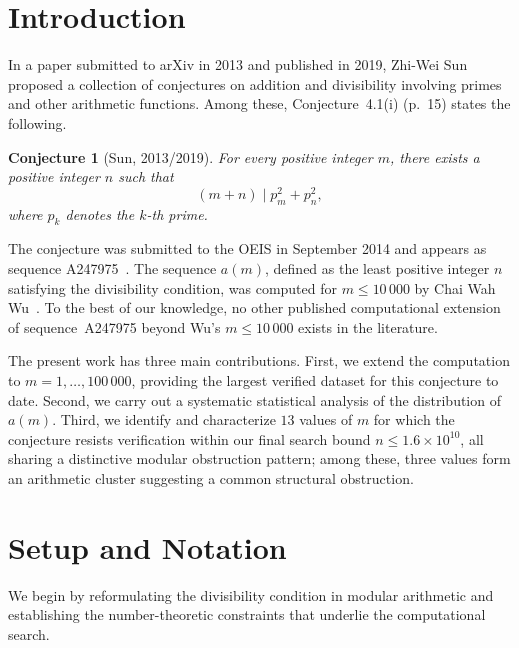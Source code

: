 \documentclass[12pt]{article}
\newtheorem{conjecture}{Conjecture}
\begin{document}
	\section{Introduction}
	
	In a paper submitted to arXiv in 2013 and published in 2019,
	Zhi-Wei Sun~\cite{Sun2019} proposed a collection of conjectures on
	addition and divisibility involving primes and other arithmetic
	functions.
	Among these, Conjecture~4.1(i) (p.~15) states the following.
	
	\begin{conjecture}[Sun, 2013/2019]\label{conj:sun}
		For every positive integer $m$, there exists a positive integer $n$
		such that
		\[
		(m + n) \mid p_m^2 + p_n^2,
		\]
		where $p_k$ denotes the $k$-th prime.
	\end{conjecture}
	
	The conjecture was submitted to the OEIS in September 2014 and appears
	as sequence A247975~\cite{OEIS_A247975}.
	The sequence $a(m)$, defined as the least positive integer $n$
	satisfying the divisibility condition, was computed for $m \leq 10\,000$
	by Chai Wah Wu~\cite{WuOEIS}.
	To the best of our knowledge, no other published computational
	extension of sequence~A247975 beyond Wu's $m \leq 10\,000$ exists in
	the literature.
	
	The present work has three main contributions.
	First, we extend the computation to $m = 1, \ldots, 100\,000$,
	providing the largest verified dataset for this conjecture to date.
	Second, we carry out a systematic statistical analysis of the
	distribution of $a(m)$.
	Third, we identify and characterize $13$ values of $m$ for which the
	conjecture resists verification within our final search bound
	$n \leq 1.6 \times 10^{10}$, all sharing a distinctive modular
	obstruction pattern; among these, three values form an arithmetic
	cluster suggesting a common structural obstruction.
	
	\section{Setup and Notation}
	
	We begin by reformulating the divisibility condition in modular
	arithmetic and establishing the number-theoretic constraints that
	underlie the computational search.
	
\end{document}
